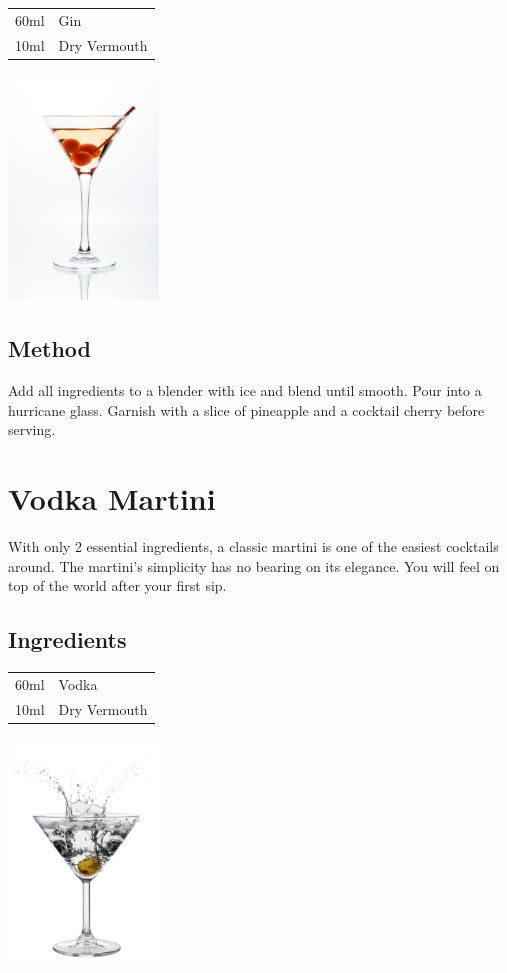 \documentclass[12pt, letterpaper]{article}
\begin{document}
\begin{multicols}{2}

\begin{tabular} { r | l}
    60ml & Gin \\
    10ml & Dry Vermouth 
\end{tabular}

\includegraphics[height=6cm]{drymartini}

\end{multicols}

\subsection*{Method}
Add all ingredients to a blender with ice and blend until smooth.
Pour into a hurricane glass. Garnish with a slice of pineapple and a cocktail cherry before serving.

\pagebreak
\section{Vodka Martini}
With only 2 essential ingredients, a classic martini is one of the easiest cocktails around.
The martini's simplicity has no bearing on its elegance.
You will feel on top of the world after your first sip.
\subsection*{Ingredients}

\begin{multicols}{2}

\begin{tabular} { r | l}
    60ml & Vodka \\
    10ml & Dry Vermouth 
\end{tabular}

\includegraphics[height=6cm]{vodkamartini}

\end{multicols}
\end{document}

